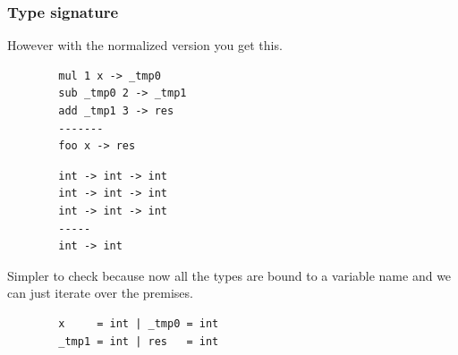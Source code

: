 \begin{frame}[fragile]
    \frametitle{Type signature}
    However with the normalized version you get this.
    \begin{lstlisting}
        mul 1 x -> _tmp0
        sub _tmp0 2 -> _tmp1
        add _tmp1 3 -> res
        -------
        foo x -> res
    \end{lstlisting}
    \begin{lstlisting}
        int -> int -> int
        int -> int -> int
        int -> int -> int
        -----
        int -> int
    \end{lstlisting}
    Simpler to check because now all the types are bound to a variable name and we can just iterate over the premises.
    \begin{lstlisting}
        x     = int | _tmp0 = int
        _tmp1 = int | res   = int
    \end{lstlisting} 
\end{frame}